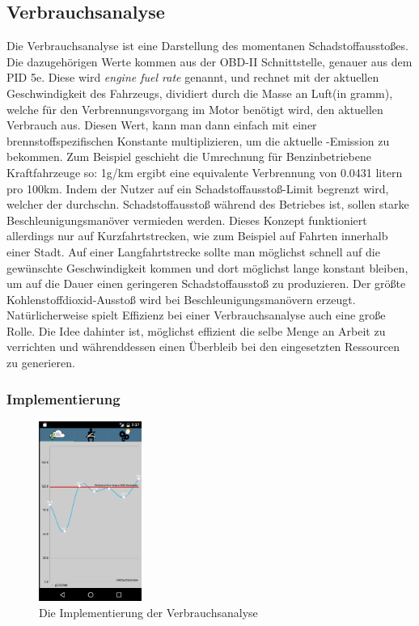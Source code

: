 \subsection{Verbrauchsanalyse}
\label{subsec:verbrauchsanalyse}

Die Verbrauchsanalyse ist eine Darstellung des momentanen Schadstoffausstoßes.
Die dazugehörigen Werte kommen aus der OBD-II Schnittstelle, genauer aus dem PID 5e.
Diese wird \textit{engine fuel rate} genannt, und rechnet mit der 
aktuellen Geschwindigkeit des Fahrzeugs, dividiert durch die Masse an Luft(in gramm), 
welche für den Verbrennungsvorgang im Motor benötigt wird,
den aktuellen Verbrauch aus. Diesen Wert, kann man dann einfach mit einer brennstoffspezifischen
Konstante multiplizieren, um die aktuelle -Emission zu bekommen.
Zum Beispiel geschieht die Umrechnung für Benzinbetriebene Kraftfahrzeuge so:
1g/km  ergibt eine equivalente Verbrennung von 0.0431 litern pro 100km. 
Indem der Nutzer auf ein Schadstoffausstoß-Limit begrenzt wird, welcher der durchschn.
Schadstoffausstoß während des Betriebes ist, sollen starke Beschleunigungsmanöver 
vermieden werden. Dieses Konzept funktioniert allerdings nur auf Kurzfahrtstrecken,
wie zum Beispiel auf Fahrten innerhalb einer Stadt.
Auf einer Langfahrtstrecke sollte man möglichst schnell auf die gewünschte Geschwindigkeit kommen
und dort möglichst lange konstant bleiben, um auf die Dauer einen geringeren Schadstoffausstoß zu produzieren.
Der größte Kohlenstoffdioxid-Ausstoß wird bei Beschleunigungsmanövern erzeugt.
Natürlicherweise spielt Effizienz bei einer Verbrauchsanalyse auch eine große Rolle.
Die Idee dahinter ist, möglichst effizient die selbe Menge an Arbeit zu verrichten und währenddessen einen Überbleib
bei den eingesetzten Ressourcen zu generieren. 




\subsubsection{Implementierung}

\begin{figure}
    \centering
    \includegraphics[width=0.3\textwidth]{images/verbrauch}
    \caption{Die Implementierung der Verbrauchsanalyse \cite{BOZH.ch3-verbrauchsanalyse.verbrauch}}
\end{figure}

